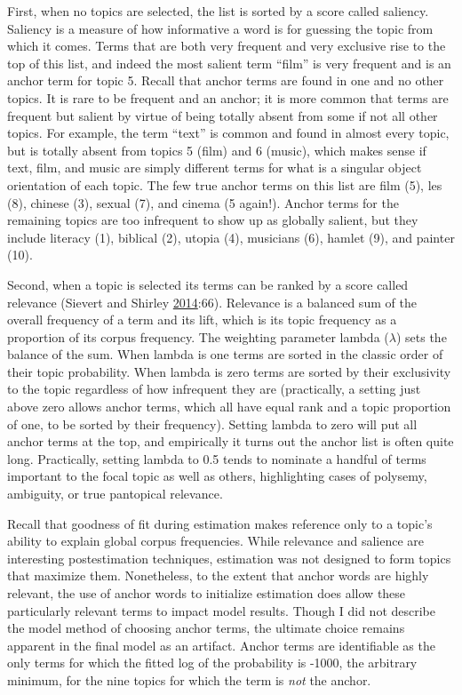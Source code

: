 \documentclass[]{book}
\theoremstyle{definition}
\theoremstyle{definition}
\theoremstyle{definition}
\theoremstyle{remark}
\begin{document}
First, when no topics are selected, the list is sorted by a score called
saliency. Saliency is a measure of how informative a word is for
guessing the topic from which it comes. Terms that are both very
frequent and very exclusive rise to the top of this list, and indeed the
most salient term ``film'' is very frequent and is an anchor term for
topic 5. Recall that anchor terms are found in one and no other topics.
It is rare to be frequent and an anchor; it is more common that terms
are frequent but salient by virtue of being totally absent from some if
not all other topics. For example, the term ``text'' is common and found
in almost every topic, but is totally absent from topics 5 (film) and 6
(music), which makes sense if text, film, and music are simply different
terms for what is a singular object orientation of each topic. The few
true anchor terms on this list are film (5), les (8), chinese (3),
sexual (7), and cinema (5 again!). Anchor terms for the remaining topics
are too infrequent to show up as globally salient, but they include
literacy (1), biblical (2), utopia (4), musicians (6), hamlet (9), and
painter (10).

Second, when a topic is selected its terms can be ranked by a score
called relevance (Sievert and Shirley
\protect\hyperlink{ref-Sievert2014LDAvis}{2014}:66). Relevance is a
balanced sum of the overall frequency of a term and its lift, which is
its topic frequency as a proportion of its corpus frequency. The
weighting parameter lambda (\(\lambda\)) sets the balance of the sum.
When lambda is one terms are sorted in the classic order of their topic
probability. When lambda is zero terms are sorted by their exclusivity
to the topic regardless of how infrequent they are (practically, a
setting just above zero allows anchor terms, which all have equal rank
and a topic proportion of one, to be sorted by their frequency). Setting
lambda to zero will put all anchor terms at the top, and empirically it
turns out the anchor list is often quite long. Practically, setting
lambda to 0.5 tends to nominate a handful of terms important to the
focal topic as well as others, highlighting cases of polysemy,
ambiguity, or true pantopical relevance.

Recall that goodness of fit during estimation makes reference only to a
topic's ability to explain global corpus frequencies. While relevance
and salience are interesting postestimation techniques, estimation was
not designed to form topics that maximize them. Nonetheless, to the
extent that anchor words are highly relevant, the use of anchor words to
initialize estimation does allow these particularly relevant terms to
impact model results. Though I did not describe the model method of
choosing anchor terms, the ultimate choice remains apparent in the final
model as an artifact. Anchor terms are identifiable as the only terms
for which the fitted log of the probability is -1000, the arbitrary
minimum, for the nine topics for which the term is \emph{not} the
anchor.
\end{document}
